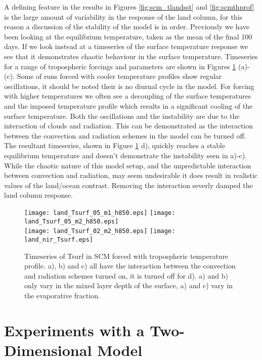 A defining feature in the results in Figures \ref{fig:scm_tlandsst} and 
\ref{fig:scmthprof} is the large amount of variability in the response of the 
land column, for this reason a discussion of the stability of the model is in 
order. Previously we have been looking at the equilibrium temperature, taken as 
the mean of the final 100 days. If we look instead at a timeseries of the 
surface temperature response we see that it demonstrates chaotic behaviour in 
the surface temperature. Timeseries for a range of tropospheric forcings and 
parameters are shown in Figures \ref{fig:scmts} (a)-(c). Some of runs forced 
with cooler temperature profiles show regular oscillations, it should be noted 
their is no diurnal cycle in the model.  For forcing with higher temperatures we 
often see a decoupling of the surface temperatures and the imposed temperature 
profile which results in a significant cooling of the surface temperature.  Both 
the oscillations and the instability are due to the interaction of clouds and 
radiation. This can be demonstrated as the interaction between the convection 
and radiation schemes in the model can be turned off. The resultant timeseries, 
shown in Figure \ref{fig:scmts} d), quickly reaches a stable equilibrium 
temperature and doesn't demonstrate the instability seen in a)-c). While the 
chaotic nature of this model setup, and the unpredictable interaction between 
convection and radiation, may seem undesirable it does result in realistic 
values of the land/ocean contrast. Removing the interaction severly damped the 
land column response. 

\begin{figure}[ht]
\texttt{[image: land\_Tsurf\_05\_m1\_h850.eps]}
\texttt{[image: land\_Tsurf\_05\_m2\_h850.eps]}\\
\texttt{[image: land\_Tsurf\_02\_m2\_h850.eps]}
\texttt{[image: land\_nir\_Tsurf.eps]}\\
\caption{Timeseries of Tsurf in SCM forced with tropospheric temperature 
profile. a), b) and c) all have the interaction between the convection and 
radiation schemes turned on, it is turned off for d). a) and b) only vary in the 
mixed layer depth of the surface, a) and c) vary in the evaporative fraction.}
\label{fig:scmts}
\end{figure}



\clearpage




\section{Experiments with a Two-Dimensional Model}

